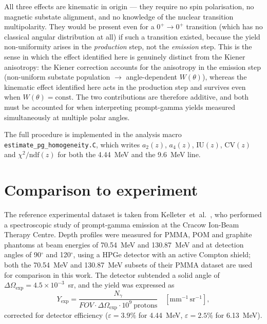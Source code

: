 \documentclass[a4paper]{article}
\begin{document}
All three effects are kinematic in origin — they require no spin polarisation, no magnetic substate alignment, and no knowledge of the nuclear transition multipolarity. They would be present even for a $0^+ \to 0^+$ transition (which has no classical angular distribution at all) if such a transition existed, because the yield non-uniformity arises in the \emph{production} step, not the \emph{emission} step. This is the sense in which the effect identified here is genuinely distinct from the Kiener anisotropy: the Kiener correction accounts for the anisotropy in the emission step (non-uniform substate population $\to$ angle-dependent $W(\theta)$), whereas the kinematic effect identified here acts in the production step and survives even when $W(\theta) = \mathrm{const}$. The two contributions are therefore additive, and both must be accounted for when interpreting prompt-gamma yields measured simultaneously at multiple polar angles.

The full procedure is implemented in the analysis macro \texttt{estimate\_pg\_homogeneity.C}, which writes $a_2(z)$, $a_4(z)$, $\mathrm{IU}(z)$, $\mathrm{CV}(z)$ and $\chi^2/\mathrm{ndf}(z)$ for both the 4.44~MeV and the 9.6~MeV line.

\section{Comparison to experiment}
\label{sec:comparison}

The reference experimental dataset is taken from Kelleter~et~al.~\cite{kelleter2017}, who performed a spectroscopic study of prompt-gamma emission at the Cracow Ion-Beam Therapy Centre. Depth profiles were measured for PMMA, POM and graphite phantoms at beam energies of 70.54~MeV and 130.87~MeV and at detection angles of 90$^\circ$ and 120$^\circ$, using a HPGe detector with an active Compton shield; both the 70.54~MeV and 130.87~MeV subsets of their PMMA dataset are used for comparison in this work. The detector subtended a solid angle of $\Delta\Omega_\mathrm{exp} = 4.5 \times 10^{-3}$~sr, and the yield was expressed as
\begin{equation}
    Y_\mathrm{exp} = \frac{N_\gamma}{FOV \cdot \Delta\Omega_\mathrm{exp} \cdot 10^9~\mathrm{protons}}
    \quad [\mathrm{mm^{-1}\,sr^{-1}}],
    \label{eq:yield_exp}
\end{equation}
corrected for detector efficiency ($\varepsilon = 3.9\%$ for 4.44~MeV, $\varepsilon = 2.5\%$ for 6.13~MeV).
\end{document}
